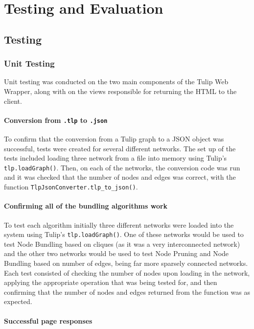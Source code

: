 \documentclass[../dissertation.tex]{subfiles}
\begin{document}
\chapter{Testing and Evaluation}

\section{Testing}

\subsection{Unit Testing}

Unit testing was conducted on the two main components of the Tulip Web Wrapper, along with on the views responsible for returning the HTML to the client. 

\subsubsection{Conversion from \texttt{.tlp} to \texttt{.json}}

To confirm that the conversion from a Tulip graph to a JSON object was successful, tests were created for several different networks. The set up of the tests included loading three network from a file into memory using Tulip's \texttt{tlp.loadGraph()}. Then, on each of the networks, the conversion code was run and it was checked that the number of nodes and edges was correct, with the function \texttt{TlpJsonConverter.tlp\_to\_json()}.

\subsubsection{Confirming all of the bundling algorithms work}

To test each algorithm initially three different networks were loaded into the system using Tulip's \texttt{tlp.loadGraph()}. One of these networks would be used to test Node Bundling based on cliques (as it was a very interconnected network) and the other two networks would be used to test Node Pruning and Node Bundling based on number of edges, being far more sparsely connected networks. Each test consisted of checking the number of nodes upon loading in the network, applying the appropriate operation that was being tested for, and then confirming that the number of nodes and edges returned from the function was as expected.

\subsubsection{Successful page responses}
\end{document}
